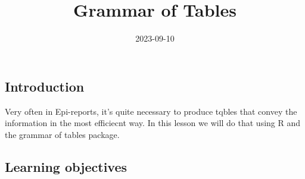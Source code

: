 \documentclass[
]{article}
\title{Grammar of Tables}
\author{}
\date{\vspace{-2.5em}2023-09-10}
\begin{document}
\maketitle

{
\setcounter{tocdepth}{2}
\tableofcontents
}
\hypertarget{introduction}{%
\subsection{Introduction}\label{introduction}}

Very often in Epi-reports, it's quite necessary to produce tqbles that
convey the information in the most efficiecnt way. In this lesson we
will do that using R and the grammar of tables package.

\hypertarget{learning-objectives}{%
\subsection{Learning objectives}\label{learning-objectives}}
\end{document}
